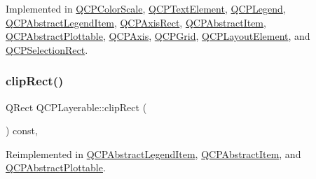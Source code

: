 Implemented in \mbox{\hyperlink{class_q_c_p_color_scale_af1b24d24a70f25b65d29f09e413390a8}{Q\+C\+P\+Color\+Scale}}, \mbox{\hyperlink{class_q_c_p_text_element_a91f2e4b4a639d9079e89a0030c7ed352}{Q\+C\+P\+Text\+Element}}, \mbox{\hyperlink{class_q_c_p_legend_a817f75c234f82a2e26643dc0de742095}{Q\+C\+P\+Legend}}, \mbox{\hyperlink{class_q_c_p_abstract_legend_item_a6bfbcb9ace779f4f6fe22241c32a67c9}{Q\+C\+P\+Abstract\+Legend\+Item}}, \mbox{\hyperlink{class_q_c_p_axis_rect_a4a318008e2b7f881a14c3d97186b31f9}{Q\+C\+P\+Axis\+Rect}}, \mbox{\hyperlink{class_q_c_p_abstract_item_a5579ce9ec7cad202499886b042448b10}{Q\+C\+P\+Abstract\+Item}}, \mbox{\hyperlink{class_q_c_p_abstract_plottable_ac032077fb0db93d6faa3273d02363398}{Q\+C\+P\+Abstract\+Plottable}}, \mbox{\hyperlink{class_q_c_p_axis_adbaeffcdc2707f2bd5dc1bbd11236770}{Q\+C\+P\+Axis}}, \mbox{\hyperlink{class_q_c_p_grid_a64fa48e16b4629f5df2a5029ab6e761c}{Q\+C\+P\+Grid}}, \mbox{\hyperlink{class_q_c_p_layout_element_a0a8f18141bcf46cf40ad4c13324ff346}{Q\+C\+P\+Layout\+Element}}, and \mbox{\hyperlink{class_q_c_p_selection_rect_aa854697618e16037ba9c73056abfb9bf}{Q\+C\+P\+Selection\+Rect}}.

\mbox{\label{class_q_c_p_layerable_acbcfc9ecc75433747b1978a77b1864b3}} 
\subsubsection{\texorpdfstring{clipRect()}{clipRect()}}
{\footnotesize\ttfamily Q\+Rect Q\+C\+P\+Layerable\+::clip\+Rect (\begin{DoxyParamCaption}{ }\end{DoxyParamCaption}) const\hspace{0.3cm}{\ttfamily [protected]}, {\ttfamily [virtual]}}



Reimplemented in \mbox{\hyperlink{class_q_c_p_abstract_legend_item_a806fa4d0104bdfc141aa8a36fcc9d51c}{Q\+C\+P\+Abstract\+Legend\+Item}}, \mbox{\hyperlink{class_q_c_p_abstract_item_a6ad60000f29afe11035e1f791dcbd45a}{Q\+C\+P\+Abstract\+Item}}, and \mbox{\hyperlink{class_q_c_p_abstract_plottable_a635cee3effc07ad421414c76fd83548c}{Q\+C\+P\+Abstract\+Plottable}}.

\mbox{\label{class_q_c_p_layerable_ae546370644a5551c76af739afc008bee}} 
